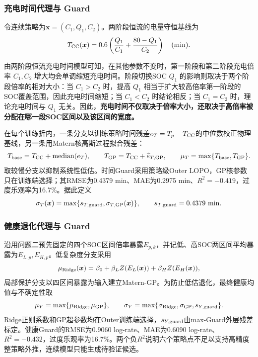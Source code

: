 \documentclass[withoutpreface]{cumcmthesis}
\begin{document}
\subsubsection{充电时间代理与 Guard}
令连续策略为$\boldsymbol x=(C_1,Q_1,C_2)$。两阶段恒流的电量守恒基线为
\begin{equation}
T_{\rm CC}(\boldsymbol x)=0.6\left(\frac{Q_1}{C_1}+\frac{80-Q_1}{C_2}\right)\quad(\mathrm{min}).
\label{eq:p4-tcc}
\end{equation}

由两阶段恒流充电时间模型可知，在其他参数不变时，第一阶段和第二阶段充电倍率 $C_1,C_2$ 增大均会单调缩短充电时间。阶段切换SOC $Q_1$ 的影响则取决于两个阶段倍率的相对大小：当 $C_1 > C_2$ 时，提高 $Q_1$ 相当于扩大较高倍率第一阶段的SOC覆盖范围，因此充电时间缩短；当 $C_1 < C_2$ 时结论相反；当 $C_1 = C_2$ 时，理论充电时间与 $Q_1$ 无关。因此，\textbf{充电时间不仅取决于倍率大小，还取决于高倍率被分配在哪一段SOC区间以及该区间的宽度。}

在每个训练折内，一条分支以训练策略时间残差$e_T=T_p-T_{\rm CC}$的中位数校正物理基线，另一条用Matern核高斯过程拟合残差：
\begin{equation}
T_{\rm base}=T_{\rm CC}+\mathop{\mathrm{median}}(e_T),\qquad
T_{\rm GP}=T_{\rm CC}+\widehat e_{T,\rm GP},\qquad
\mu_T=\max\{T_{\rm base},T_{\rm GP}\}.
\label{eq:p4-time-guard}
\end{equation}
取较慢分支以抑制系统性低估。时间Guard采用策略级Outer LOPO，GP核参数只在训练端选择；其RMSE为0.4379 min、MAE为0.2975 min、$R^2=-0.419$，过度乐观率为16.7\%。据此定义
\begin{equation}
\sigma_T(\boldsymbol x)=\max\{s_{T,\rm guard},\sigma_{T,\rm GP}(\boldsymbol x)\},
\qquad s_{T,\rm guard}=0.4379\ \mathrm{min}.
\label{eq:p4-time-sigma}
\end{equation}

\subsubsection{健康退化代理与 Guard}
沿用问题二预先固定的四个SOC区间倍率暴露$E_{p,k}$，并记低、高SOC两区间平均暴露为$E_{L,p},E_{H,p}$。低复杂度分支采用
\begin{equation}
\mu_{\rm Ridge}(\boldsymbol x)=\beta_0+\beta_L Z(E_L(\boldsymbol x))+\beta_H Z(E_H(\boldsymbol x)),
\end{equation}
局部保护分支以四区间暴露为输入建立Matern-GP。为防止低估退化，最终健康均值与不确定性取
\begin{equation}
\mu_Y=\max\{\mu_{\rm Ridge},\mu_{\rm GP}\},\qquad
\sigma_Y=\max\{\sigma_{\rm Ridge},\sigma_{\rm GP},s_{Y,\rm guard}\}.
\label{eq:p4-health-guard}
\end{equation}
Ridge正则系数和GP超参数均在Outer训练端选择，$s_{Y,\rm guard}$由max-Guard外层残差标定。健康Guard的RMSE为0.9060 log-rate、MAE为0.6090 log-rate、$R^2=-0.432$，过度乐观率为16.7\%。两个负$R^2$说明六个策略点不足以支持高精度整策略外推，连续模型只能生成待验证候选。
\end{document}
